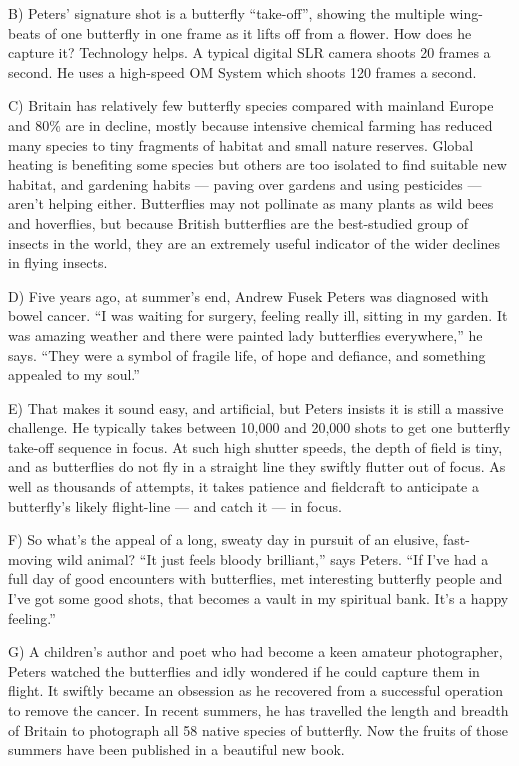 \documentclass[UTF8,11pt]{ctexart}
\begin{document}
B) Peters’ signature shot is a butterfly “take-off”, showing the multiple wing-beats of one butterfly in one frame as it lifts off from a flower. How does he capture it? Technology helps. A typical digital SLR camera shoots 20 frames a second. He uses a high-speed OM System which shoots 120 frames a second.


C) Britain has relatively few butterfly species compared with mainland Europe and 80\% are in decline, mostly because intensive chemical farming has reduced many species to tiny fragments of habitat and small nature reserves. Global heating is benefiting some species but others are too isolated to find suitable new habitat, and gardening habits — paving over gardens and using pesticides — aren’t helping either. Butterflies may not pollinate as many plants as wild bees and hoverflies, but because British butterflies are the best-studied group of insects in the world, they are an extremely useful indicator of the wider declines in flying insects.


D) Five years ago, at summer’s end, Andrew Fusek Peters was diagnosed with bowel cancer. “I was waiting for surgery, feeling really ill, sitting in my garden. It was amazing weather and there were painted lady butterflies everywhere,” he says. “They were a symbol of fragile life, of hope and defiance, and something appealed to my soul.”


E) That makes it sound easy, and artificial, but Peters insists it is still a massive challenge. He typically takes between 10,000 and 20,000 shots to get one butterfly take-off sequence in focus. At such high shutter speeds, the depth of field is tiny, and as butterflies do not fly in a straight line they swiftly flutter out of focus. As well as thousands of attempts, it takes patience and fieldcraft to anticipate a butterfly’s likely flight-line — and catch it — in focus.


F) So what’s the appeal of a long, sweaty day in pursuit of an elusive, fast-moving wild animal? “It just feels bloody brilliant,” says Peters. “If I’ve had a full day of good encounters with butterflies, met interesting butterfly people and I’ve got some good shots, that becomes a vault in my spiritual bank. It’s a happy feeling.”


G) A children’s author and poet who had become a keen amateur photographer, Peters watched the butterflies and idly wondered if he could capture them in flight. It swiftly became an obsession as he recovered from a successful operation to remove the cancer. In recent summers, he has travelled the length and breadth of Britain to photograph all 58 native species of butterfly. Now the fruits of those summers have been published in a beautiful new book.
\end{document}
